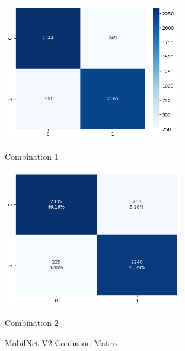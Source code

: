 \begin{figure}[H]
    \centering
    \begin{minipage}[b]{0.49\textwidth}
        \centering
        \includegraphics[width=\textwidth, height=6cm]{Figures/balanced_data/more_data/withoutbn/mn2/cm.png}
        \captionsetup{labelformat=empty}
        \caption{Combination 1}
        \label{fig:u_wo_r_cm}
    \end{minipage}
    \hfill
    \begin{minipage}[b]{0.49\textwidth}
        \centering
        \includegraphics[width=\textwidth, height=6cm]{Figures/balanced_data/more_data/withbn/mn2/cm.png}
        \captionsetup{labelformat=empty}
        \caption{Combination 2}
        \label{fig:u_w_r_cm}
    \end{minipage}
    \captionsetup{labelformat=default}
    \caption{MobilNet V2 Confusion Matrix}
\end{figure}



